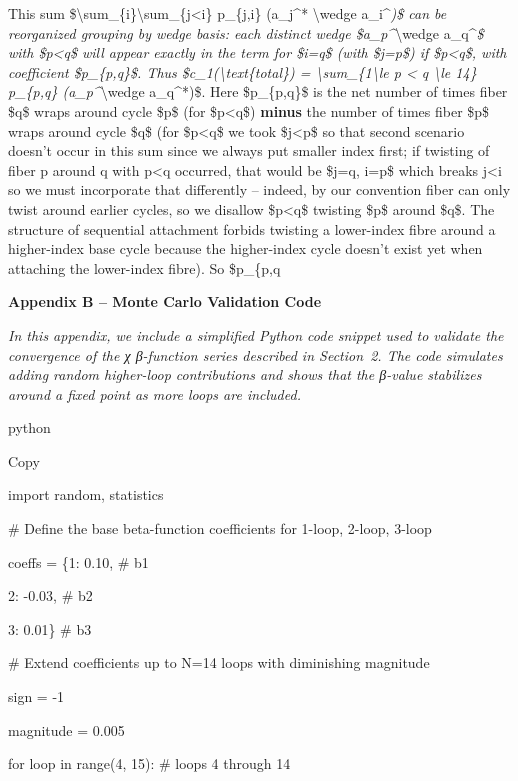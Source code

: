 \documentclass[]{article}
\begin{document}
This sum
\$\textbackslash{}sum\_\{i\}\textbackslash{}sum\_\{j\textless{}i\}
p\_\{j,i\} (a\_j\^{}* \textbackslash{}wedge a\_i\^{}\emph{)\$ can be
reorganized grouping by wedge basis: each distinct wedge
\$a\_p\^{}}\textbackslash{}wedge a\_q\^{}\emph{\$ with \$p\textless{}q\$
will appear exactly in the term for \$i=q\$ (with \$j=p\$) if
\$p\textless{}q\$, with coefficient \$p\_\{p,q\}\$. Thus
\$c\_1(\textbackslash{}text\{total\}) =
\textbackslash{}sum\_\{1\textbackslash{}le p \textless{} q
\textbackslash{}le 14\} p\_\{p,q\} (a\_p\^{}}\textbackslash{}wedge
a\_q\^{}*)\$. Here \$p\_\{p,q\}\$ is the net number of times fiber \$q\$
wraps around cycle \$p\$ (for \$p\textless{}q\$) \textbf{minus} the
number of times fiber \$p\$ wraps around cycle \$q\$ (for
\$p\textless{}q\$ we took \$j\textless{}p\$ so that second scenario
doesn't occur in this sum since we always put smaller index first; if
twisting of fiber p around q with p\textless{}q occurred, that would be
\$j=q, i=p\$ which breaks j\textless{}i so we must incorporate that
differently -- indeed, by our convention fiber can only twist around
earlier cycles, so we disallow \$p\textless{}q\$ twisting \$p\$ around
\$q\$. The structure of sequential attachment forbids twisting a
lower-index fibre around a higher-index base cycle because the
higher-index cycle doesn't exist yet when attaching the lower-index
fibre). So \$p\_\{p,q

\textbf{Appendix B -- Monte Carlo Validation Code}

\emph{In this appendix, we include a simplified Python code snippet used
to validate the convergence of the χ β-function series described in
Section~2. The code simulates adding random higher-loop contributions
and shows that the β-value stabilizes around a fixed point as more loops
are included.}

python

Copy

import random, statistics

\# Define the base beta-function coefficients for 1-loop, 2-loop, 3-loop

coeffs = \{1: 0.10, \# b1

2: -0.03, \# b2

3: 0.01\} \# b3

\# Extend coefficients up to N=14 loops with diminishing magnitude

sign = -1

magnitude = 0.005

for loop in range(4, 15): \# loops 4 through 14
\end{document}
